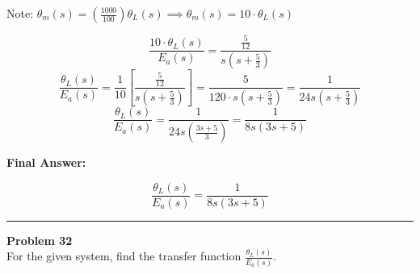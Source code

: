 \documentclass[11pt]{article}
\begin{document}
\vspace{5pt}
Note: $\theta_m(s) = \left(\frac{1000}{100}\right) \theta_L(s) \implies \theta_m(s) = 10 \cdot \theta_L(s)$

\[
\frac{10 \cdot \theta_L(s)}{E_a(s)} = \frac{\frac{5}{12}}{s\left(s + \frac{5}{3}\right)}
\]
\[
\frac{\theta_L(s)}{E_a(s)} = \frac{1}{10} \left[ \frac{\frac{5}{12}}{s\left(s + \frac{5}{3}\right)} \right]
= \frac{5}{120 \cdot s\left(s + \frac{5}{3}\right)} = \frac{1}{24s\left(s + \frac{5}{3}\right)}
\]
\[
\frac{\theta_L(s)}{E_a(s)} = \frac{1}{24s\left(\frac{3s+5}{3}\right)} = \frac{1}{8s(3s+5)}
\]


\vspace{5pt}
\noindent\textbf{Final Answer:}

\[
\boxed{
\frac{\theta_L(s)}{E_a(s)} = \frac{1}{8s(3s+5)}
}
\]


\newpage
  \setcounter{page}{62}  
\noindent\rule{\textwidth}{1pt}
\noindent\textbf{Problem 32} \hfill 
\\ For the given system, find the transfer function $\frac{\theta_L(s)}{E_a(s)}$.
\end{document}
